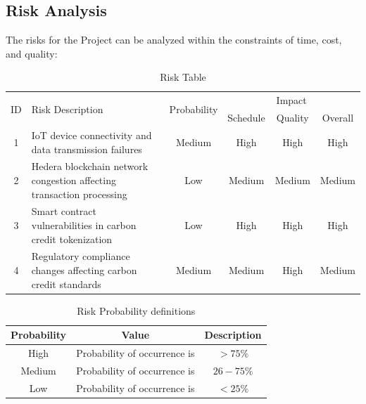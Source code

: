 \documentclass[oneside,a4paper,12pt]{book}
\renewcommand{\arraystretch}{1.5}
\begin{document}
\subsection{Risk Analysis}
The risks for the Project can be analyzed within the constraints of time, cost, and quality:

\begin{table}[!htbp]
\begin{center}
\def\arraystretch{1.5}
\begin{tabularx}{\textwidth}{| c | X | c | c | c | c |}
\hline
\multirow{2}{*}{ID} & \multirow{2}{*}{Risk Description}	& \multirow{2}{*}{Probability} & \multicolumn{3}{|c|}{Impact} \\ \cline{4-6}
	& & &	Schedule	& Quality	& Overall \\ \hline
1	& IoT device connectivity and data transmission failures	& Medium	& High  & High	& High \\ \hline
2	& Hedera blockchain network congestion affecting transaction processing	& Low	& Medium	& Medium	& Medium \\ \hline
3	& Smart contract vulnerabilities in carbon credit tokenization	& Low	& High	& High	& High \\ \hline
4	& Regulatory compliance changes affecting carbon credit standards	& Medium	& Medium	& High	& Medium \\ \hline
\end{tabularx}
\end{center}
\caption{Risk Table}
\label{tab:risk}
\end{table}

\begin{table}[!htbp]
\begin{center}
\def\arraystretch{1.5}
\begin{tabular}{| c | c | c |}
\hline
Probability & Value &	Description \\ \hline
High &	Probability of occurrence is &  $ > 75 \% $ \\ \hline
Medium &	Probability of occurrence is  & $26-75 \% $ \\ \hline
Low	& Probability of occurrence is & $ < 25 \% $ \\ \hline
\end{tabular}
\end{center}
\caption{Risk Probability definitions}
\label{tab:riskdef}
\end{table}
\end{document}
